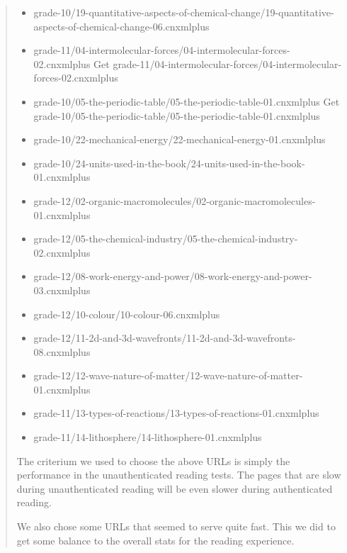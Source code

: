 \documentclass[letterpaper,10pt,english]{sphinxmanual}
\begin{document}
\begin{quote}
\begin{itemize}
\item {} 
grade-10/19-quantitative-aspects-of-chemical-change/19-quantitative-aspects-of-chemical-change-06.cnxmlplus

\item {} 
grade-11/04-intermolecular-forces/04-intermolecular-forces-02.cnxmlplus Get grade-11/04-intermolecular-forces/04-intermolecular-forces-02.cnxmlplus

\item {} 
grade-10/05-the-periodic-table/05-the-periodic-table-01.cnxmlplus Get grade-10/05-the-periodic-table/05-the-periodic-table-01.cnxmlplus

\item {} 
grade-10/22-mechanical-energy/22-mechanical-energy-01.cnxmlplus

\item {} 
grade-10/24-units-used-in-the-book/24-units-used-in-the-book-01.cnxmlplus

\item {} 
grade-12/02-organic-macromolecules/02-organic-macromolecules-01.cnxmlplus

\item {} 
grade-12/05-the-chemical-industry/05-the-chemical-industry-02.cnxmlplus

\item {} 
grade-12/08-work-energy-and-power/08-work-energy-and-power-03.cnxmlplus

\item {} 
grade-12/10-colour/10-colour-06.cnxmlplus

\item {} 
grade-12/11-2d-and-3d-wavefronts/11-2d-and-3d-wavefronts-08.cnxmlplus

\item {} 
grade-12/12-wave-nature-of-matter/12-wave-nature-of-matter-01.cnxmlplus

\item {} 
grade-11/13-types-of-reactions/13-types-of-reactions-01.cnxmlplus

\item {} 
grade-11/14-lithosphere/14-lithosphere-01.cnxmlplus

\end{itemize}

The criterium we used to choose the above URLs is simply the performance
in the unauthenticated reading tests.  The pages that are slow during
unauthenticated reading will be even slower during authenticated reading.

We also chose some URLs that seemed to serve quite fast.  This we did to get
some balance to the overall stats for the reading experience.


\end{quote}
\end{document}
